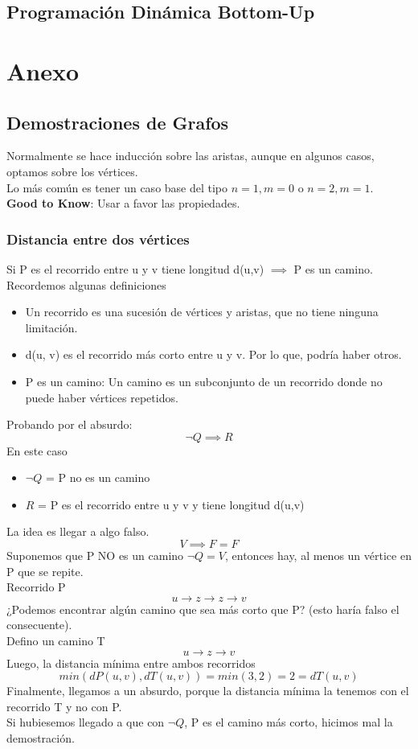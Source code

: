 \documentclass[10pt,a4paper]{article}
\begin{document}
\subsection*{Programación Dinámica Bottom-Up}

\section*{Anexo}
\subsection*{Demostraciones de Grafos}
Normalmente se hace inducción sobre las aristas, aunque en algunos casos, optamos sobre los vértices. \\
Lo más común es tener un caso base del tipo $n=1, m=0$ o $n=2, m=1$. \\
\textbf{Good to Know}: Usar a favor las propiedades.
\subsubsection*{Distancia entre dos vértices}
\label{subsubsec:distancia_demostracion}
Si P es el recorrido entre u y v tiene longitud d(u,v) $\implies$ P es un camino. \\
Recordemos algunas definiciones
\begin{itemize}
    \item Un recorrido es una sucesión de vértices y aristas, que no tiene ninguna limitación.
    \item d(u, v) es el recorrido más corto entre u y v. Por lo que, podría haber otros. 
    \item P es un camino: Un camino es un subconjunto de un recorrido donde no puede haber vértices repetidos.
\end{itemize}
Probando por el absurdo: 
\[\neg Q \implies R\]
En este caso
\begin{itemize}
    \item $\neg Q$ = P no es un camino
    \item $R$ = P es el recorrido entre u y v y tiene longitud d(u,v)
\end{itemize}
La idea es llegar a algo falso.  
\[V \implies F = F\]
Suponemos que P NO es un camino $\neg Q = V$, entonces hay, al menos un vértice en P que se repite.  \\
Recorrido P \[u \rightarrow z \rightarrow z \rightarrow v\]
¿Podemos encontrar algún camino que sea más corto que P? (esto haría falso el consecuente). \\
Defino un camino T \[u \rightarrow z \rightarrow v\] 
Luego, la distancia mínima entre ambos recorridos
\[min(dP(u,v), dT(u,v)) = min(3, 2) = 2 = dT(u,v)\]
Finalmente, llegamos a un absurdo, porque la distancia mínima la tenemos con el recorrido T y no con P. \\
Si hubiesemos llegado a que con $\neg Q$, P es el camino más corto, hicimos mal la demostración.
\end{document}
